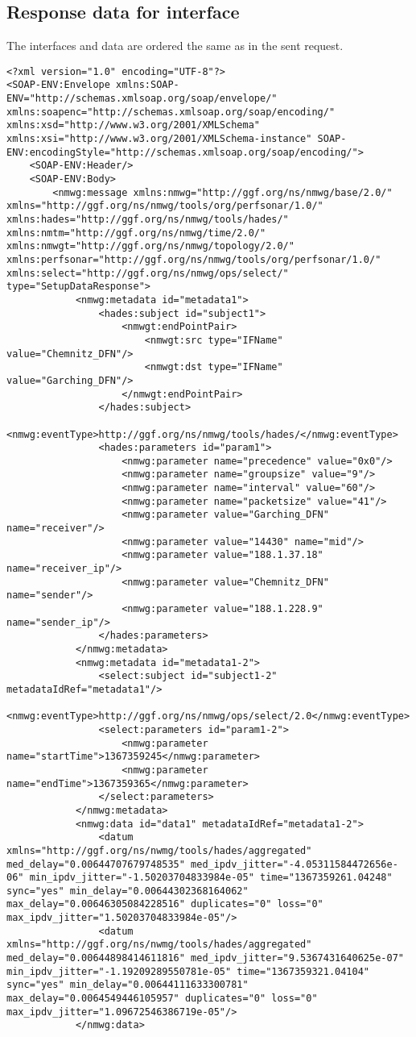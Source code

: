 \documentclass[a4paper,12pt,titlepage,hidelinks,fleqn]{article}
\begin{document}
\subsection{Response data for interface}
\begin{flushleft}
The interfaces and data are ordered the same as in the sent request. 
\begin{framed}
\begin{lstlisting}
<?xml version="1.0" encoding="UTF-8"?>
<SOAP-ENV:Envelope xmlns:SOAP-ENV="http://schemas.xmlsoap.org/soap/envelope/" xmlns:soapenc="http://schemas.xmlsoap.org/soap/encoding/" xmlns:xsd="http://www.w3.org/2001/XMLSchema" xmlns:xsi="http://www.w3.org/2001/XMLSchema-instance" SOAP-ENV:encodingStyle="http://schemas.xmlsoap.org/soap/encoding/">
	<SOAP-ENV:Header/>
	<SOAP-ENV:Body>
		<nmwg:message xmlns:nmwg="http://ggf.org/ns/nmwg/base/2.0/" xmlns="http://ggf.org/ns/nmwg/tools/org/perfsonar/1.0/" xmlns:hades="http://ggf.org/ns/nmwg/tools/hades/" xmlns:nmtm="http://ggf.org/ns/nmwg/time/2.0/" xmlns:nmwgt="http://ggf.org/ns/nmwg/topology/2.0/" xmlns:perfsonar="http://ggf.org/ns/nmwg/tools/org/perfsonar/1.0/" xmlns:select="http://ggf.org/ns/nmwg/ops/select/" type="SetupDataResponse">
			<nmwg:metadata id="metadata1">
				<hades:subject id="subject1">
					<nmwgt:endPointPair>
						<nmwgt:src type="IFName" value="Chemnitz_DFN"/>
						<nmwgt:dst type="IFName" value="Garching_DFN"/>
					</nmwgt:endPointPair>
				</hades:subject>
				<nmwg:eventType>http://ggf.org/ns/nmwg/tools/hades/</nmwg:eventType>
				<hades:parameters id="param1">
					<nmwg:parameter name="precedence" value="0x0"/>
					<nmwg:parameter name="groupsize" value="9"/>
					<nmwg:parameter name="interval" value="60"/>
					<nmwg:parameter name="packetsize" value="41"/>
					<nmwg:parameter value="Garching_DFN" name="receiver"/>
					<nmwg:parameter value="14430" name="mid"/>
					<nmwg:parameter value="188.1.37.18" name="receiver_ip"/>
					<nmwg:parameter value="Chemnitz_DFN" name="sender"/>
					<nmwg:parameter value="188.1.228.9" name="sender_ip"/>
				</hades:parameters>
			</nmwg:metadata>
			<nmwg:metadata id="metadata1-2">
				<select:subject id="subject1-2" metadataIdRef="metadata1"/>
				<nmwg:eventType>http://ggf.org/ns/nmwg/ops/select/2.0</nmwg:eventType>
				<select:parameters id="param1-2">
					<nmwg:parameter name="startTime">1367359245</nmwg:parameter>
					<nmwg:parameter name="endTime">1367359365</nmwg:parameter>
				</select:parameters>
			</nmwg:metadata>
			<nmwg:data id="data1" metadataIdRef="metadata1-2">
				<datum xmlns="http://ggf.org/ns/nwmg/tools/hades/aggregated" med_delay="0.00644707679748535" med_ipdv_jitter="-4.05311584472656e-06" min_ipdv_jitter="-1.50203704833984e-05" time="1367359261.04248" sync="yes" min_delay="0.00644302368164062" max_delay="0.00646305084228516" duplicates="0" loss="0" max_ipdv_jitter="1.50203704833984e-05"/>
				<datum xmlns="http://ggf.org/ns/nwmg/tools/hades/aggregated" med_delay="0.00644898414611816" med_ipdv_jitter="9.5367431640625e-07" min_ipdv_jitter="-1.19209289550781e-05" time="1367359321.04104" sync="yes" min_delay="0.00644111633300781" max_delay="0.0064549446105957" duplicates="0" loss="0" max_ipdv_jitter="1.09672546386719e-05"/>
			</nmwg:data>
			

\end{lstlisting}
\end{framed}
\end{flushleft}
\end{document}
